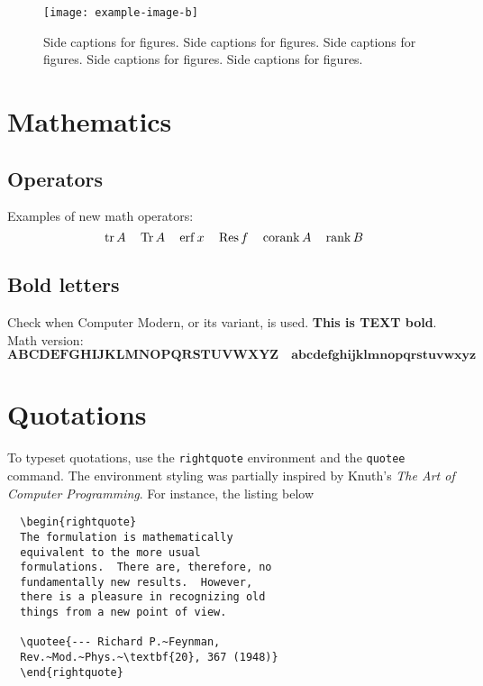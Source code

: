 \documentclass{article}
\begin{document}
\begin{SCfigure}
  \texttt{[image: example-image-b]}
  \caption{Side captions for figures.
Side captions for figures.
Side captions for figures.
Side captions for figures.
Side captions for figures.}
\end{SCfigure}

\section{Mathematics}

\subsection{Operators}

Examples of new math operators:
\begin{equation}
  \operatorname{tr}{A}\quad \operatorname{Tr}{A}\quad \operatorname{erf}{x}\quad \operatorname{Res}{f}\quad \operatorname{corank}{A}\quad \operatorname{rank}{B}
\end{equation}

\subsection{Bold letters}

Check when Computer Modern, or its variant, is used. \textbf{This is TEXT bold}.  Math version:
\begin{equation}
  \mathbf{ABCDEFGHIJKLMNOPQRSTUVWXYZ}\quad \mathbf{abcdefghijklmnopqrstuvwxyz}
\end{equation}

\section{Quotations}

\thetitle

\theheadtitle

To typeset quotations, use the \verb|rightquote| environment and the \verb|quotee| command.
The environment styling was partially inspired by Knuth's \emph{The Art of Computer Programming}.
For instance, the listing below

\begin{verbatim}
  \begin{rightquote}
  The formulation is mathematically
  equivalent to the more usual
  formulations.  There are, therefore, no
  fundamentally new results.  However,
  there is a pleasure in recognizing old
  things from a new point of view.

  \quotee{--- Richard P.~Feynman,
  Rev.~Mod.~Phys.~\textbf{20}, 367 (1948)}
  \end{rightquote}
\end{verbatim}
\end{document}

